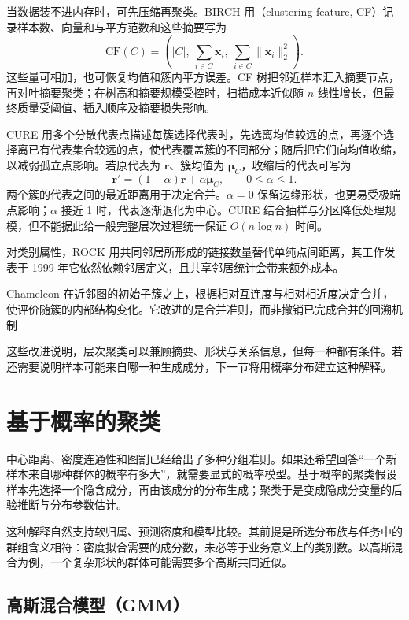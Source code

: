 当数据装不进内存时，可先压缩再聚类。BIRCH 用（clustering feature, CF）记录样本数、向量和与平方范数和这些摘要写为
\[
 \mathrm{CF}(C)=
 \left(|C|,\ \sum_{i\in C}\bm{x}_i,\
 \sum_{i\in C}\lVert\bm{x}_i\rVert_2^2\right).
\]
这些量可相加，也可恢复均值和簇内平方误差。CF 树把邻近样本汇入摘要节点，再对叶摘要聚类；在树高和摘要规模受控时，扫描成本近似随 $n$ 线性增长，但最终质量受阈值、插入顺序及摘要损失影响。

CURE 用多个分散代表点描述每簇选择代表时，先选离均值较远的点，再逐个选择离已有代表集合较远的点，使代表覆盖簇的不同部分；随后把它们向均值收缩，以减弱孤立点影响。若原代表为 $\bm{r}$、簇均值为 $\bm{\mu}_C$，收缩后的代表可写为
\[
 \bm{r}'=(1-\alpha)\bm{r}+\alpha\bm{\mu}_C,
 \qquad 0\leq\alpha\leq1.
\]
两个簇的代表之间的最近距离用于决定合并。$\alpha=0$ 保留边缘形状，也更易受极端点影响；$\alpha$ 接近 1 时，代表逐渐退化为中心。CURE 结合抽样与分区降低处理规模，但不能据此给一般完整层次过程统一保证 $O(n\log n)$ 时间。

对类别属性，ROCK 用共同邻居所形成的链接数量替代单纯点间距离，其工作发表于 1999 年它依然依赖邻居定义，且共享邻居统计会带来额外成本。

\Needspace{55mm}
Chameleon 在近邻图的初始子簇之上，根据相对互连度与相对相近度决定合并，使评价随簇的内部结构变化。它改进的是合并准则，而非撤销已完成合并的回溯机制

这些改进说明，层次聚类可以兼顾摘要、形状与关系信息，但每一种都有条件。若还需要说明样本可能来自哪一种生成成分，下一节将用概率分布建立这种解释。

\section{基于概率的聚类}
\label{sec:clustering-probabilistic}

中心距离、密度连通性和图割已经给出了多种分组准则。如果还希望回答“一个新样本来自哪种群体的概率有多大”，就需要显式的概率模型。基于概率的聚类假设样本先选择一个隐含成分，再由该成分的分布生成；聚类于是变成隐成分变量的后验推断与分布参数估计。

这种解释自然支持软归属、预测密度和模型比较。其前提是所选分布族与任务中的群组含义相符：密度拟合需要的成分数，未必等于业务意义上的类别数。以高斯混合为例，一个复杂形状的群体可能需要多个高斯共同近似。

\subsection{高斯混合模型（GMM）}
\label{sec:clustering-gmm}

